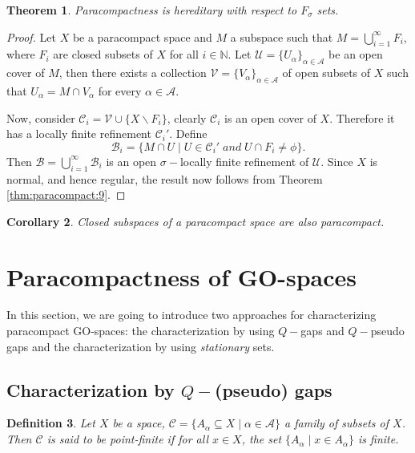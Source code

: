 \documentclass[12pt,oneside,english]{amsbook}
\numberwithin{equation}{section} %
\numberwithin{figure}{section} %
\theoremstyle{plain}
\numberwithin{section}{chapter}
\newtheorem{thm}{Theorem}[section]
\theoremstyle{plain}
\newtheorem{corollary}[thm]{Corollary}
\newtheorem{defn}[thm]{Definition}
\begin{document}
\begin{thm}
  Paracompactness is hereditary with respect to $F_{\sigma}$ sets.
\end{thm}
\begin{proof}
  Let $X$ be a paracompact space and $M$ a subspace such that $M = \bigcup_{i = 1}^{\infty}F_{i}$, where $F_{i}$ are closed subsets of $X$ for all $i \in \mathbb{N}$. Let $\mathcal{U} = \{ U_{\alpha} \}_{\alpha \in \mathcal{A}}$ be an open cover of $M$, then there exists a collection $\mathcal{V} = \{V_{\alpha}\}_{\alpha \in \mathcal{A}}$ of open subsets of $X$ such that $U_{\alpha} = M \cap V_{\alpha}$ for every $\alpha \in \mathcal{A}$.

  Now, consider $\mathcal{C}_{i} = \mathcal{V} \cup \{X \backslash F_{i} \}$, clearly $\mathcal{C}_{i}$ is an open cover of $X$. Therefore it has a locally finite refinement $\mathcal{C}_{i}'$. Define $$\mathcal{B}_{i} = \{ M \cap U \; | \; U \in \mathcal{C}_{i}' \; and \; U \cap F_{i} \neq \phi \}.$$ Then $\mathcal{B} = \bigcup_{i = 1}^{\infty} \mathcal{B}_{i}$ is an open $\sigma -$locally finite refinement of $\mathcal{U}$. Since $X$ is normal, and hence regular, the result now follows from Theorem \ref{thm:paracompact:9}.
\end{proof}

\begin{corollary}
  Closed subspaces of a paracompact space are also paracompact.
\end{corollary}

\section{Paracompactness of GO-spaces}

In this section, we are going to introduce two approaches for characterizing paracompact GO-spaces: the characterization by using $Q-$gaps and $Q-$pseudo gaps and the characterization by using \emph{stationary} sets.
\subsection{Characterization by $Q-$(pseudo) gaps}

\begin{defn}
  Let $X$ be a space,  $\mathcal{C} = \{ A_{\alpha} \subseteq X \; | \; \alpha \in \mathcal{A} \}$ a family of subsets of $X$. Then $\mathcal{C}$ is said to be point-finite if for all $x \in X$, the set $\{  A_{\alpha} \; | \; x \in A_{\alpha}  \}$ is finite.
\end{defn}
\end{document}
